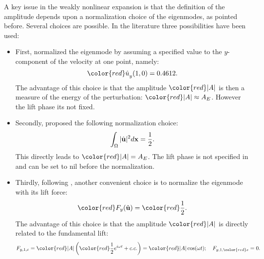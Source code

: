 \documentclass[twocolumn,10pt]{asme2ej}
\newcommand{\be}[1]{ \begin{equation} \label{#1}}
\newcommand{\ee}{\end{equation}}
\begin{document}
\iffalse
\begin{eqnarray}
\begin{aligned}
F_{x,WNL} = F_{x}({\bf q}_{bc})&+\epsilon^2 \big( 
F_{x}({\bf q}_{\epsilon})- 2\mathsf{D}({\bf u}_{bc}) \big)\\
&+F_{x}({\bf q}_{2,0})|A|^2\\
&+2F_{x,r}({\bf q}_{2,2}\cos(2\omega t)+
2F_{x,i}({\bf q}_{2,2}\sin(2\omega t)
),\\
\end{aligned}\\
F_{y,WNL} = |A|^2 \big[ F_{y}({\bf \hat{q}})e^{i\omega_{LC} t} +c.c. \big],
\end{eqnarray}
\fi



{\color{blue}
A key issue in the weakly nonlinear expansion is that the definition of the amplitude depends upon a normalization choice of the eigenmodes{\color{red}, as pointed before}. Several choices are possible. In the literature three possibilities have been used:
\begin{itemize}
\item First, \cite{SippLebedev} normalized the eigenmode by assuming a specified value to the $y$-component of the velocity at one point, namely:
\be{normsipp}
{\color{red}\hat{u}}_y(1,0) = 0.4612.
\ee
The advantage of this choice is that the amplitude ${\color{red}|A|}$ is then a measure of the energy of the perturbation: 
${\color{red}|A|} \approx A_E$. {\color{red}However the lift phase its not fixed.}

\item Secondly, \cite{FDR2016} proposed the following {\color{red}normalization} choice:
\be{normFDR}
\int_\Omega |\hat{\bf u}|^2 d {\bf x}  = \frac{1}{2}.
\ee
This directly leads to ${\color{red}|A|} = A_E$. {\color{red} The lift phase is not specified in \cite{FDR2016} and can be set to nil before the normalization.}

\item Thirdly, following \cite{Fabre2012}, another convenient choice is to normalize the eigenmode with its lift 
force: 
\be{normfabre}
{\color{red}F_y(\hat{\bf u}) }={\color{red} \frac{1}{2}}.
\ee
The advantage of this choice is that the amplitude ${\color{red}|A|}$ is directly related to the fundamental lift:
\be{lift_explanation}
F_{y,1,c} 
= {\color{red}|A|} \left( {\color{red}\frac{1}{2}} e^{i \omega t} + c.c. \right)
=   {\color{red}|A|} \cos (\omega t) ; \quad F_{y,1,{\color{red}s}} = 0. 
\ee

\end{itemize}
}
\end{document}
